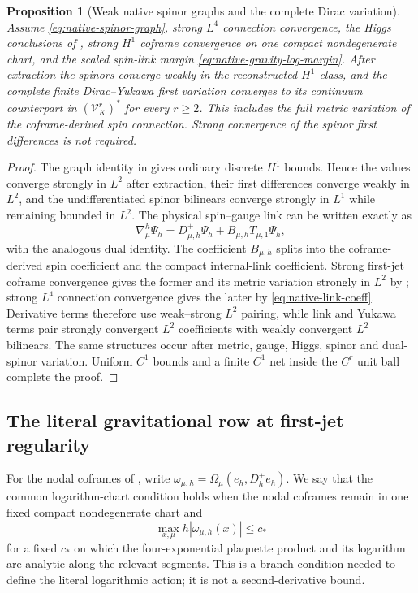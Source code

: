 \documentclass[11pt]{article}
\numberwithin{equation}{section}
\newtheorem{proposition}[proposition]{Proposition}
\theoremstyle{definition}
\theoremstyle{remark}
\newcommand{\Vtest}{\mathscr V}
\begin{document}
\begin{proposition}[Weak native spinor graphs and the complete Dirac variation]
\label{prop:native-spinor-variation}
Assume \eqref{eq:native-spinor-graph}, strong $L^4$ connection convergence,
the Higgs conclusions of , strong
$H^1$ coframe convergence on one compact nondegenerate chart, and the scaled
spin-link margin \eqref{eq:native-gravity-log-margin}. After
extraction the spinors converge weakly in the reconstructed $H^1$ class, and
the complete finite Dirac--Yukawa first variation converges to its continuum
counterpart in $(\Vtest_K^r)^*$ for every $r\ge2$.  This includes the full
metric variation of the coframe-derived spin connection.  Strong convergence
of the spinor first differences is not required.
\end{proposition}
\begin{proof}
The graph identity in  gives ordinary
discrete $H^1$ bounds.  Hence the values converge strongly in $L^2$ after
extraction, their first differences converge weakly in $L^2$, and the
undifferentiated spinor bilinears converge strongly in $L^1$ while remaining
bounded in $L^2$.  The physical spin--gauge link can be written exactly as
\[
 \nabla^h_\mu\Psi_h=D^+_{\mu,h}\Psi_h+B_{\mu,h}T_{\mu,1}\Psi_h,
\]
with the analogous dual identity.  The coefficient $B_{\mu,h}$ splits into
the coframe-derived spin coefficient and the compact internal-link
coefficient.  Strong first-jet coframe convergence gives the former and its
metric variation strongly in $L^2$ by ; strong $L^4$
connection convergence gives the latter by \eqref{eq:native-link-coeff}.
Derivative terms therefore use weak--strong $L^2$ pairing, while link and
Yukawa terms pair strongly convergent $L^2$ coefficients with weakly
convergent $L^2$ bilinears.  The same structures occur after metric, gauge,
Higgs, spinor and dual-spinor variation.  Uniform $C^1$ bounds and a finite
$C^1$ net inside the $C^r$ unit ball complete the proof.
\end{proof}

\subsection{The literal gravitational row at first-jet regularity}

For the nodal coframes of , write
$\omega_{\mu,h}=\Omega_\mu(e_h,D_h^+e_h)$.  We say that the common
logarithm-chart condition holds when the nodal coframes remain in one fixed
compact nondegenerate chart and
\begin{equation}
 \max_{x,\mu}h|\omega_{\mu,h}(x)|\le c_*
 \label{eq:native-gravity-log-margin}
\end{equation}
for a fixed $c_*$ on which the four-exponential plaquette product and its
logarithm are analytic along the relevant segments.  This is a branch
condition needed to define the literal logarithmic action; it is not a
second-derivative bound.
\end{document}
